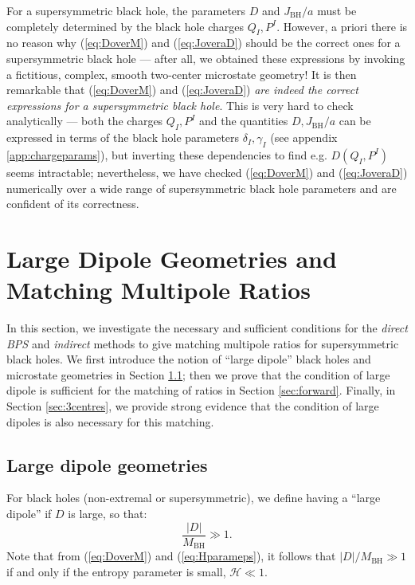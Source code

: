 \documentclass[12pt,a4paper]{article}
\newcommand{\be}{\begin{equation}}
\newcommand{\ee}{\end{equation}}
\def\indirect{\emph{indirect} }
\def\direct{\emph{direct BPS} }
\begin{document}
For a supersymmetric black hole, the parameters $D$ and $J_\text{BH}/a$ must be completely determined by the black hole charges $Q_I, P^I$. However, a priori there is no reason why (\ref{eq:DoverM}) and (\ref{eq:JoveraD}) should be the correct ones for a supersymmetric black hole --- after all, we obtained these expressions by invoking a fictitious, complex, smooth two-center microstate geometry! It is then remarkable that (\ref{eq:DoverM}) and (\ref{eq:JoveraD}) \emph{are indeed the correct expressions for a supersymmetric black hole}. This is very hard to check analytically --- both the charges $Q_I,P^I$ and the quantities $D, J_\text{BH}/a$ can be expressed in terms of the black hole parameters $\delta_I,\gamma_I$ (see appendix \ref{app:chargeparams}), but inverting these dependencies to find e.g. $D(Q_I,P^I)$ seems intractable; nevertheless, we have checked (\ref{eq:DoverM}) and (\ref{eq:JoveraD}) numerically over a wide range of supersymmetric black hole parameters and are confident of its correctness.


\section{Large Dipole Geometries and Matching Multipole Ratios}\label{sec:matchingproofs}

In this section, we investigate the necessary and sufficient conditions for the \direct and \indirect methods to give matching multipole ratios for supersymmetric black holes. We first introduce the notion of ``large dipole'' black holes and microstate geometries in Section \ref{sec:largeDipoleMS}; then we prove that the condition of large dipole is sufficient for the matching of ratios in Section \ref{sec:forward}. Finally, in Section \ref{sec:3centres}, we provide strong evidence that the condition of large dipoles is also necessary for this matching.


\subsection{Large dipole geometries}\label{sec:largeDipoleMS}
For black holes (non-extremal or supersymmetric), we define having a ``large dipole'' if $D$ is large, so that:
\be \label{eq:largedipoleBH} \frac{|D|}{M_\text{BH}}\gg 1.\ee
Note that from (\ref{eq:DoverM}) and (\ref{eq:Hparameps}), it follows that $|D|/M_\text{BH}\gg 1$ if and only if the entropy parameter is small, $\mathcal{H}\ll 1$.
\end{document}
